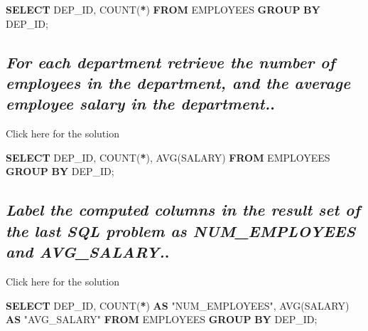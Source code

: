 \documentclass[
]{book}
\newenvironment{Shaded}{\begin{snugshade}}{\end{snugshade}}
\newcommand{\FunctionTok}[1]{\textcolor[rgb]{0.00,0.00,0.00}{#1}}
\newcommand{\KeywordTok}[1]{\textcolor[rgb]{0.13,0.29,0.53}{\textbf{#1}}}
\newcommand{\NormalTok}[1]{#1}
\newcommand{\OperatorTok}[1]{\textcolor[rgb]{0.81,0.36,0.00}{\textbf{#1}}}
\newcommand{\OtherTok}[1]{\textcolor[rgb]{0.56,0.35,0.01}{#1}}
\begin{document}
\begin{Shaded}
\begin{Highlighting}[]
\KeywordTok{SELECT}\NormalTok{ DEP\_ID, }\FunctionTok{COUNT}\NormalTok{(}\OperatorTok{*}\NormalTok{)}
\KeywordTok{FROM}\NormalTok{ EMPLOYEES}
\KeywordTok{GROUP} \KeywordTok{BY}\NormalTok{ DEP\_ID;}
\end{Highlighting}
\end{Shaded}

\hypertarget{for-each-department-retrieve-the-number-of-employees-in-the-department-and-the-average-employee-salary-in-the-department..}{%
\subsection{\texorpdfstring{\emph{For each department retrieve the number of employees in the department, and the average employee salary in the department.}.}{For each department retrieve the number of employees in the department, and the average employee salary in the department..}}\label{for-each-department-retrieve-the-number-of-employees-in-the-department-and-the-average-employee-salary-in-the-department..}}

Click here for the solution

\begin{Shaded}
\begin{Highlighting}[]
\KeywordTok{SELECT}\NormalTok{ DEP\_ID, }\FunctionTok{COUNT}\NormalTok{(}\OperatorTok{*}\NormalTok{), }\FunctionTok{AVG}\NormalTok{(SALARY)}
\KeywordTok{FROM}\NormalTok{ EMPLOYEES}
\KeywordTok{GROUP} \KeywordTok{BY}\NormalTok{ DEP\_ID;}
\end{Highlighting}
\end{Shaded}

\hypertarget{label-the-computed-columns-in-the-result-set-of-the-last-sql-problem-as-num_employees-and-avg_salary..}{%
\subsection{\texorpdfstring{\emph{Label the computed columns in the result set of the last SQL problem as NUM\_EMPLOYEES and AVG\_SALARY.}.}{Label the computed columns in the result set of the last SQL problem as NUM\_EMPLOYEES and AVG\_SALARY..}}\label{label-the-computed-columns-in-the-result-set-of-the-last-sql-problem-as-num_employees-and-avg_salary..}}

Click here for the solution

\begin{Shaded}
\begin{Highlighting}[]
\KeywordTok{SELECT}\NormalTok{ DEP\_ID, }\FunctionTok{COUNT}\NormalTok{(}\OperatorTok{*}\NormalTok{) }\KeywordTok{AS} \OtherTok{"NUM\_EMPLOYEES"}\NormalTok{, }\FunctionTok{AVG}\NormalTok{(SALARY) }\KeywordTok{AS} \OtherTok{"AVG\_SALARY"}
\KeywordTok{FROM}\NormalTok{ EMPLOYEES}
\KeywordTok{GROUP} \KeywordTok{BY}\NormalTok{ DEP\_ID;}
\end{Highlighting}
\end{Shaded}
\end{document}
